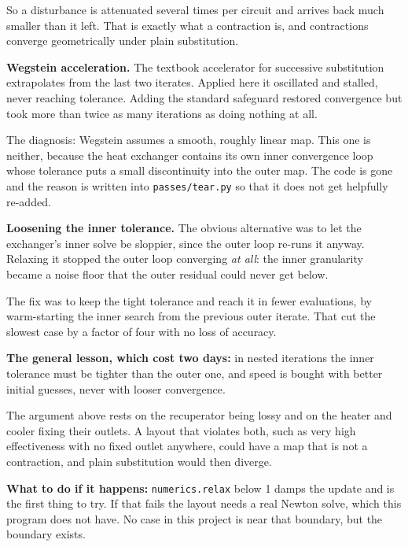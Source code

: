 \documentclass[11pt,a4paper]{report}
\newcommand{\code}[1]{\texttt{\small #1}}
\begin{document}
So a disturbance is attenuated several times per circuit and arrives back
much smaller than it left. That is exactly what a contraction is, and
contractions converge geometrically under plain substitution.

\begin{caveat}[title={Caveat: two attempts to speed this up both backfired}]
\textbf{Wegstein acceleration.} The textbook accelerator for successive
substitution extrapolates from the last two iterates. Applied here it
oscillated and stalled, never reaching tolerance. Adding the standard
safeguard restored convergence but took more than twice as many iterations
as doing nothing at all.

The diagnosis: Wegstein assumes a smooth, roughly linear map. This one is
neither, because the heat exchanger contains its own inner convergence
loop whose tolerance puts a small discontinuity into the outer map. The
code is gone and the reason is written into \code{passes/tear.py} so that
it does not get helpfully re-added.

\textbf{Loosening the inner tolerance.} The obvious alternative was to let
the exchanger's inner solve be sloppier, since the outer loop re-runs it
anyway. Relaxing it stopped the outer loop converging \emph{at all}: the
inner granularity became a noise floor that the outer residual could never
get below.

The fix was to keep the tight tolerance and reach it in fewer evaluations,
by warm-starting the inner search from the previous outer iterate. That cut
the slowest case by a factor of four with no loss of accuracy.

\textbf{The general lesson, which cost two days:} in nested iterations the
inner tolerance must be tighter than the outer one, and speed is bought with
better initial guesses, never with looser convergence.
\end{caveat}

\begin{caveat}[title={Caveat: contraction is a property of these cases, not a theorem}]
The argument above rests on the recuperator being lossy and on the heater
and cooler fixing their outlets. A layout that violates both, such as very
high effectiveness with no fixed outlet anywhere, could have a map that is
not a contraction, and plain substitution would then diverge.

\textbf{What to do if it happens:} \code{numerics.relax} below \num{1}
damps the update and is the first thing to try. If that fails the layout
needs a real Newton solve, which this program does not have. No case in this
project is near that boundary, but the boundary exists.
\end{caveat}
\end{document}
